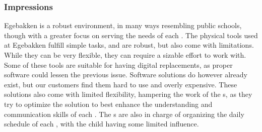 \subsubsection{Impressions}
Egebakken is a robust environment, in many ways resembling public schools, though with a greater focus on serving the needs of each \autist[]. 
The physical tools used at Egebakken fulfill simple tasks, and are robust, but also come with limitations. 
While they can be very flexible, they can require a sizable effort to work with. 
Some of these tools are suitable for having digital replacements, as proper software could lessen the previous issue. 
Software solutions do however already exist, but our customers find them hard to use and overly expensive. 
These solutions also come with limited flexibility, hampering the work of the \guardian[]s, as they try to optimize the solution to best enhance the understanding and communication skills of each \autist[]. 
The \guardian[]s are also in charge of organizing the daily schedule of each \autist[], with the child having some limited influence. 

